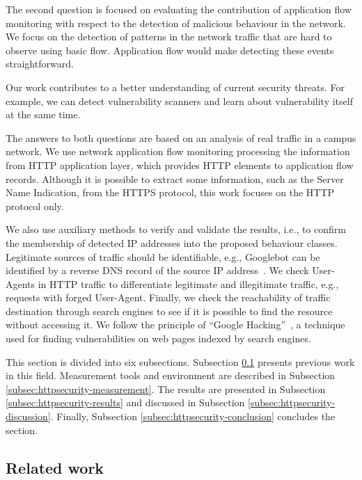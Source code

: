 The second question is focused on evaluating the contribution of application flow monitoring with respect to the detection of malicious behaviour in the network. We focus on the detection of patterns in the network traffic that are hard to observe using basic flow. Application flow would make detecting these events straightforward.

Our work contributes to a better understanding of current security threats. For example, we can detect vulnerability scanners and learn about vulnerability itself at the same time.

The answers to both questions are based on an analysis of real traffic in a campus network. We use network application flow monitoring processing the information from HTTP application layer, which provides HTTP elements to application flow records. Although it is possible to extract some information, such as the Server Name Indication, from the HTTPS protocol, this work focuses on the HTTP protocol only.

We also use auxiliary methods to verify and validate the results, i.e., to confirm the membership of detected IP addresses into the proposed behaviour classes. Legitimate sources of traffic should be identifiable, e.g., Googlebot can be identified by a reverse DNS record of the source IP address~\cite{Google--Verifying}. We check User-Agents in HTTP traffic to differentiate legitimate and illegitimate traffic, e.g., requests with forged User-Agent. Finally, we check the reachability of traffic destination through search engines to see if it is possible to find the resource without accessing it. We follow the principle of ``Google Hacking''~\cite{Billig-2008-Evaluation}, a technique used for finding vulnerabilities on web pages indexed by search engines.

This section is divided into six subsections. Subsection \ref{subsec:httpsecurity-related_work} presents previous work in this field. Measurement tools and environment are described in Subsection \ref{subsec:httpsecurity-measurement}. The results are presented in Subsection \ref{subsec:httpsecurity-results} and discussed in Subsection \ref{subsec:httpsecurity-discussion}. Finally, Subsection \ref{subsec:httpsecurity-conclusion} concludes the section.

\subsection{Related work}\label{subsec:httpsecurity-related_work}

